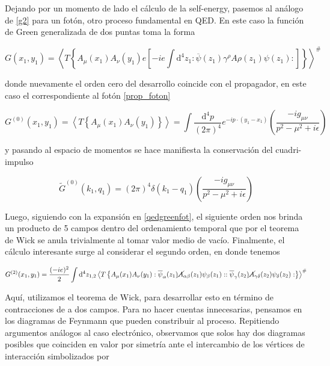 \documentclass[tickz]{article}
\numberwithin{equation}{section}
\begin{document}
Dejando por un momento de lado el cálculo de la self-energy, pasemos al análogo de \ref{g2} para un fotón, otro proceso fundamental en QED. En este caso la función de Green generalizada de dos puntas toma la forma

\begin{equation}\label{qedgreenfot}
G(x_{1},y_{1})=\left\langle T\left\{ A_{\mu}(x_{1})A_{\nu}(y_{1})e\left[-ie\int \mathrm{d^4}z_{1}:\overline{\psi}(z_{1})\gamma^{\rho}A{\rho}(z_{1})\psi(z_{1}):\right]\right\} \right\rangle ^{\#}
\end{equation}

donde nuevamente el orden cero del desarrollo coincide con el propagador, en este caso el correspondiente al fotón \ref{prop_foton}

\begin{equation}\label{key}
G^{(0)}(x_{1},y_{1})=\left\langle T\left\{  A_{\mu}(x_{1})A_{\nu}(y_{1})\right\} \right\rangle = \int\frac{\mathrm{\mathrm{d^4}}p}{(2\pi)^{4}}e^{-ip\cdot(y_1-x_1)}\left(\frac{-ig_{\mu\nu}}{p^2 -\mu^2 +i\epsilon}\right)
\end{equation}

y pasando al espacio de momentos se hace manifiesta la conservación del cuadri-impulso

\begin{equation}\label{key}
\widetilde{G}^{(0)}(k_1,q_1)=\left(2\pi\right)^4 \delta(k_1-q_1)\left(\frac{-ig_{\mu\nu}}{p^2 -\mu^2 +i\epsilon}\right)
\end{equation}

Luego, siguiendo con la expansión en \ref{qedgreenfot}, el siguiente orden nos brinda un producto de 5 campos dentro del ordenamiento temporal que por el teorema de Wick se anula trivialmente al tomar valor medio de vacío. Finalmente, el cálculo interesante surge al considerar el segundo orden, en donde tenemos

\begin{equation}\label{g2fot}
G^{(2)}(x_{1},y_{1})=\frac{(-ie)^{2}}{2}\int \mathrm{\mathrm{d^4}}z_{1,2}\left\langle T\left\{  A_{\mu}(x_{1})A_{\nu}(y_{1}):\overline{\psi}_{\alpha}(z_{1})\cancel{A}_{\alpha\beta}(z_{1})\psi_{\beta}(z_{1})::\overline{\psi}_{\gamma}(z_{2})\cancel{A}_{\gamma\delta}(z_{2})\psi_{\delta}(z_{2}):\right\} \right\rangle ^{\#}
\end{equation}

Aquí, utilizamos el teorema de Wick, para desarrollar esto en término de contracciones de a dos campos. Para no hacer cuentas innecesarias, pensamos en los diagramas de Feynmann que pueden constribuir al proceso. Repitiendo argumentos análogos al caso electrónico, observamos que solos hay dos diagramas posibles que coinciden en valor por simetría ante el intercambio de los vértices de interacción simbolizados por
\end{document}
